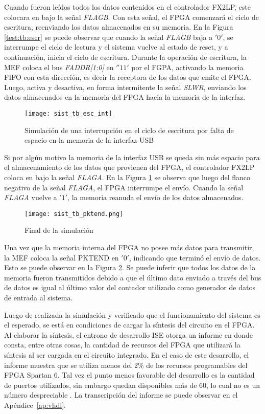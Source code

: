 	Cuando fueron leídos todos los datos contenidos en el controlador FX2LP, este colocara en bajo la señal \textit{FLAGB}. Con esta señal,
	el FPGA comenzará el ciclo de escritura, reenviando los datos almacenados en su memoria. En la Figura \ref{test:tb:escr} se puede observar que cuando la señal \textit{FLAGB} baja a $'0'$, se interrumpe el ciclo de lectura y el sistema vuelve al estado de reset, y a continuación, inicia el ciclo de escritura. Durante la operación de escritura, la MEF coloca el bus \textit{FADDR[1:0]} en $''11'$ por el FGPA, activando la memoria FIFO con esta dirección, es decir la receptora de los datos que emite el FPGA. Luego, activa y desactiva, en forma intermitente la señal \textit{SLWR}, enviando los datos almacenados en la memoria del FPGA hacia la memoria de la interfaz.
	
	\begin{figure}[t]
		\centering
		\texttt{[image: sist\_tb\_esc\_int]}
		\caption{Simulación de una interrupción en el ciclo de escritura por falta de espacio en la memoria de la interfaz USB}
		\label{test:tb:int}
	\end{figure}
	
	Si por algún motivo la memoria de la interfaz USB se queda sin más espacio para el almacenamiento de los datos que provienen del FPGA, el controlador FX2LP coloca en bajo la señal \textit{FLAGA}. En la Figura \ref{test:tb:int} se observa que luego del flanco negativo de la señal \textit{FLAGA}, el FPGA interrumpe el envío. Cuando la señal \textit{FLAGA} vuelve a $'1'$, la memoria reanuda el envío de los datos almacenados.
	
	\begin{figure}[b]
		\centering
		\texttt{[image: sist\_tb\_pktend.png]}
		\caption{Final de la simulación}
		\label{test:tb:pktend}
	\end{figure}

	Una vez que la memoria interna del FPGA no posee más datos para transmitir, la MEF coloca la señal PKTEND en $'0'$, indicando que terminó el envío de datos. Esto se puede observar en la Figura \ref{test:tb:pktend}. Se puede inferir que todos los datos de la memoria fueron transmitidos debido a que el último dato enviado a través del bus de datos es igual al último valor del contador utilizado como generador de datos de entrada al sistema. 
	
	Luego de realizada la simulación y verificado que el funcionamiento del sistema es el esperado, se está en condiciones de cargar la síntesis del circuito en el FPGA. Al elaborar la síntesis, el entrono de desarrollo ISE otorga un informe en donde consta, entre otras cosas, la cantidad de recursos del FPGA que utilizará la síntesis al ser cargada en el circuito integrado. En el caso de este desarrollo, el informe muestra que se utiliza menos del 2\% de los recursos programables del FPGA Spartan 6. Tal vez el punto menos favorable del desarrollo es la cantidad de puertos utilizados, sin embargo quedan disponibles más de 60, lo cual no es un número despreciable . La transcripción del informe se puede observar en el Apéndice~\ref{ap:vhdl}. 
		
